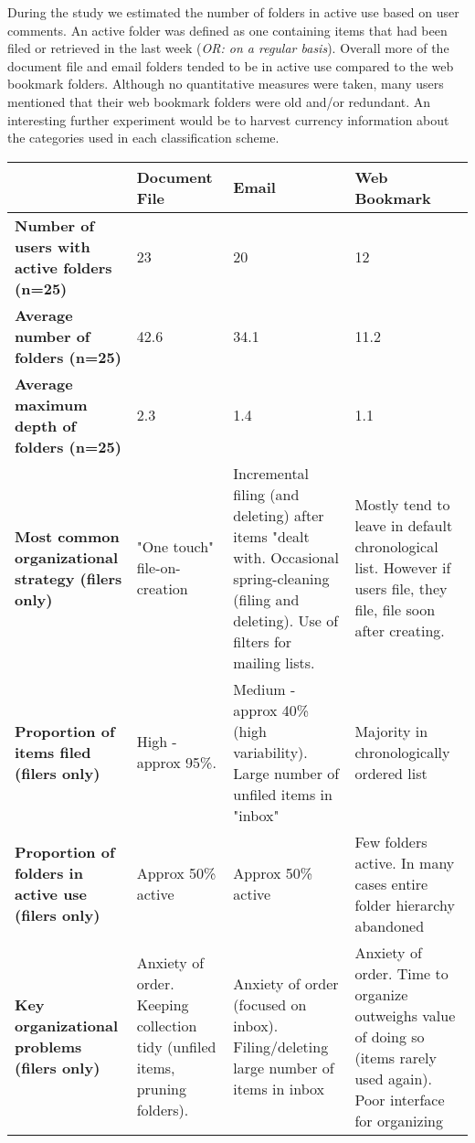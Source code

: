 \noindent
During the study we estimated the number of folders in active use based on user comments. An active folder was defined as one containing items that had been filed or retrieved in the last week (\textit{OR: on a regular basis}). Overall more of the document file and email folders tended to be in active use compared to the web bookmark folders.  Although no quantitative measures were taken, many users mentioned that their web bookmark folders were old and/or redundant. An interesting further experiment would be to harvest currency information about the categories used in each classification scheme.
\\

\begin{table}[h]
\begin{center}
\begin{footnotesize}
\begin{tabular}{|p{2.5cm}|p{3.5cm}|p{3.5cm}|p{3.5cm}|}
\hline
    {\bf } & {\bf Document File} & {\bf Email} & {\bf Web Bookmark} \\
\hline \hline
{\bf Number of users with active folders (n=25)} &         23 &         20 &         12 \\
\hline
{\bf Average number of folders (n=25)} &       42.6 &       34.1 &       11.2 \\
\hline
{\bf Average maximum depth of folders (n=25)} &        2.3 &        1.4 &        1.1 \\
\hline
{\bf Most common organizational strategy (filers only) } & "One touch" file-on-creation & Incremental filing (and deleting) after items "dealt with.  Occasional spring-cleaning (filing and deleting). Use of filters for mailing lists.  & Mostly tend to leave in default chronological list. However if users file, they file, file soon after creating.  \\
\hline
{\bf Proportion of items filed (filers only) } & High - approx 95\%. & Medium - approx 40\% (high variability). Large number of unfiled items in "inbox" & Majority in chronologically ordered list \\
\hline
{\bf Proportion of folders in active use (filers only)} & Approx 50\% active & Approx 50\% active & Few folders active. In many cases entire folder hierarchy abandoned \\
\hline
{\bf Key organizational problems (filers only)} & Anxiety of order. Keeping collection tidy (unfiled items, pruning folders).  & Anxiety of order (focused on inbox). Filing/deleting large number of items in inbox & Anxiety of order. Time to organize outweighs value of doing so (items rarely used again). Poor interface for organizing \\

\end{tabular}
\end{footnotesize}
\end{center}
\end{table}
